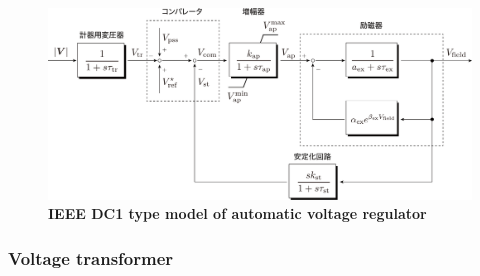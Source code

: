 \documentclass[graybox, envcountchap]{svmult}
\begin{document}
\begin{figure}[t]
\centering
\includegraphics[width = 0.99\linewidth]{figs/avrdc1}
\medskip
\caption{\textbf{IEEE DC1 type model of automatic voltage regulator}}
\label{fig:avrdc1}
\medskip
\end{figure}


\smallskip
\subsubsection{Voltage transformer}
\end{document}
